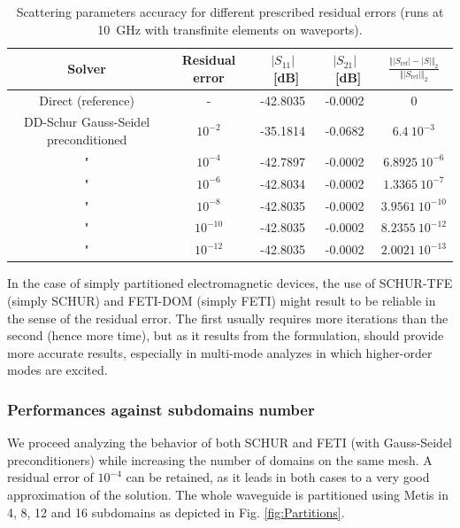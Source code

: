 \begin{table}
\begin{center}
\begin{tabular}{|c|c|c|c|c|}
\hline 
Solver & Residual error & $|S_{11}|$~[dB] & $|S_{21}|$~[dB] & $\frac{\Vert |S_\mathrm{ref}| - |S| \Vert_{2}}{\Vert|S_\mathrm{ref}|\Vert_2}$\\ 
\hline
\hline 
Direct (reference) & - & -42.8035  & -0.0002 & 0\\ \hline \hline
\setlength{\arrayrulewidth}{0.5pt}
DD-Schur Gauss-Seidel preconditioned& $10^{-2}$ & -35.1814  & -0.0682 & $6.4~10^{-3}$\\ \hline 
"& $10^{-4}$ & -42.7897 &  -0.0002 & $6.8925~10^{-6}$\\ \hline 
"& $10^{-6}$ & -42.8034 &  -0.0002 & $1.3365~10^{-7}$\\ \hline 
"& $10^{-8}$ & -42.8035 &  -0.0002 & $3.9561~10^{-10}$\\ \hline
"& $10^{-10}$ & -42.8035 &  -0.0002 & $8.2355~10^{-12}$\\ \hline
"& $10^{-12}$ & -42.8035 &  -0.0002 & $2.0021~10^{-13}$\\ \hline
\end{tabular}
\end{center}
\caption{Scattering parameters accuracy for different prescribed residual errors (runs at 10~GHz with transfinite elements on waveports).}
\label{tab:SaccTFE}
\end{table}

In the case of simply partitioned electromagnetic devices, the use of SCHUR-TFE (simply SCHUR) and FETI-DOM (simply FETI) might result to be reliable in the sense of the residual error. The first usually requires more iterations than the second (hence more time), but as it results from the formulation, should provide more accurate results, especially in multi-mode analyzes in which higher-order modes are excited.

\clearpage
\subsubsection{Performances against subdomains number}

We proceed analyzing the behavior of both SCHUR and FETI (with Gauss-Seidel preconditioners) while increasing the number of domains on the same mesh. A residual error of $10^{-4}$ can be retained, as it leads in both cases to a very good approximation of the solution. The whole waveguide is partitioned using Metis in 4, 8, 12 and 16 subdomains as depicted in Fig. \ref{fig:Partitions}. 

